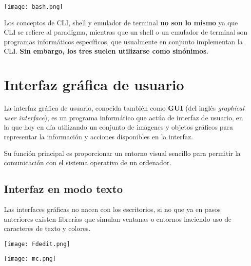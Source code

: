 \vspace{-10pt}
\begin{center}
    \texttt{[image: bash.png]}
\end{center}

Los conceptos de CLI, shell y emulador de terminal \textbf{no son lo mismo} ya que CLI se refiere al paradigma, mientras que un shell o un emulador de terminal son programas informáticos específicos, que usualmente en conjunto implementan la CLI. \textbf{Sin embargo, los tres suelen utilizarse como sinónimos}.


\section{Interfaz gráfica de usuario}

La interfaz gráfica de usuario, conocida también como \textbf{GUI} (del inglés \textit{graphical user interface}), es un programa informático que actúa de interfaz de usuario, en la que hoy en día utilizando un conjunto de imágenes y objetos gráficos para representar la información y acciones disponibles en la interfaz.

Su función principal es proporcionar un entorno visual sencillo para permitir la comunicación con el sistema operativo de un ordenador.

\subsection{Interfaz en modo texto}

Las interfaces gráficas no nacen con los escritorios, si no que ya en pasos anteriores existen librerías que simulan ventanas o entornos haciendo uso de caracteres de texto y colores.

{
    \begin{minipage}{0.49\linewidth}
        \texttt{[image: Fdedit.png]}
    \end{minipage}
    \hfill
    \begin{minipage}{0.49\linewidth}
        \texttt{[image: mc.png]}
    \end{minipage}
}



